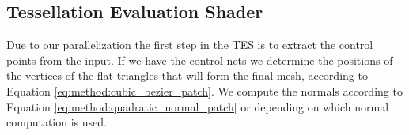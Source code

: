 \subsection{Tessellation Evaluation Shader}
\label{ss:implementation:tes}
	Due to our parallelization the first step in the TES is to extract the control points from the input. 
	If we have the control nets we determine the positions of the vertices of the flat triangles that will form the final mesh, according to Equation \eqref{eq:method:cubic_bezier_patch}. 
	We compute the normals according to Equation \eqref{eq:method:quadratic_normal_patch} or  depending on which normal computation is used. 